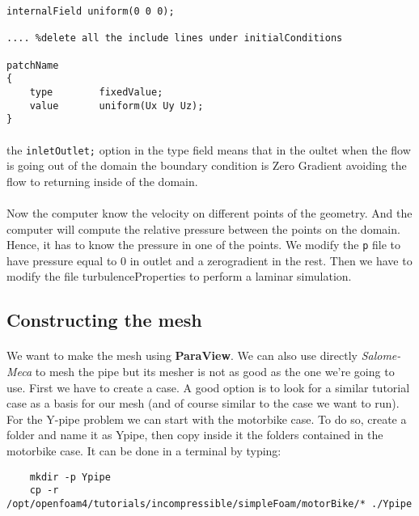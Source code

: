 \begin{lstlisting}
internalField uniform(0 0 0);

.... %delete all the include lines under initialConditions

patchName
{
	type		fixedValue;
	value 		uniform(Ux Uy Uz);
}
\end{lstlisting}

\paragraph{}the \texttt{inletOutlet;} option in the type field means that in the oultet when the flow is going out of the domain the boundary condition is Zero Gradient avoiding the flow to returning inside of the domain.
\paragraph{}Now the computer know the velocity on different points of the geometry. And the computer will compute the relative pressure between the points on the domain. Hence, it has to know the pressure in one of the points. We modify the \texttt{p} file to have pressure equal to 0 in outlet and a zerogradient in the rest. Then we have to modify the file turbulenceProperties to perform a laminar simulation. 

\subsection{Constructing the mesh}
\paragraph{}We want to make the mesh using \textbf{ParaView}. We can also use directly \emph{Salome-Meca} to mesh the pipe but its mesher is not as good as the one we're going to use. First we have to create a case. A good option is to look for a similar tutorial case as a basis for our mesh (and of course similar to the case we want to run). For the Y-pipe problem we can start with the motorbike case. To do so, create a folder and name it as Ypipe, then copy inside it the folders contained in the motorbike case. It can be done in a terminal by typing:
\begin{scriptsize}
\begin{lstlisting}
	mkdir -p Ypipe
	cp -r /opt/openfoam4/tutorials/incompressible/simpleFoam/motorBike/* ./Ypipe
\end{lstlisting}
\end{scriptsize}

